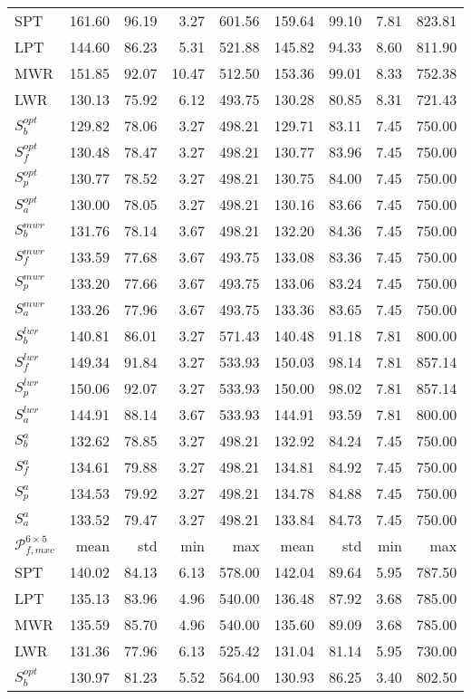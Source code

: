 {\begin{table}
{\begin{tabular}{|l|rrrr|rrrr|}
\hline
SPT &161.60&96.19&3.27&601.56&159.64&99.10&7.81&823.81\\
LPT &144.60&86.23&5.31&521.88&145.82&94.33&8.60&811.90\\
MWR &151.85&92.07&10.47&512.50&153.36&99.01&8.33&752.38\\
LWR &130.13&75.92&6.12&493.75&130.28&80.85&8.31&721.43\\
$S^{opt}_b$ &129.82&78.06&3.27&498.21&129.71&83.11&7.45&750.00\\
$S^{opt}_f$ &130.48&78.47&3.27&498.21&130.77&83.96&7.45&750.00\\
$S^{opt}_p$ &130.77&78.52&3.27&498.21&130.75&84.00&7.45&750.00\\
$S^{opt}_a$ &130.00&78.05&3.27&498.21&130.16&83.66&7.45&750.00\\
$S^{mwr}_b$ &131.76&78.14&3.67&498.21&132.20&84.36&7.45&750.00\\
$S^{mwr}_f$ &133.59&77.68&3.67&493.75&133.08&83.36&7.45&750.00\\
$S^{mwr}_p$ &133.20&77.66&3.67&493.75&133.06&83.24&7.45&750.00\\
$S^{mwr}_a$ &133.26&77.96&3.67&493.75&133.36&83.65&7.45&750.00\\
$S^{lwr}_b$ &140.81&86.01&3.27&571.43&140.48&91.18&7.81&800.00\\
$S^{lwr}_f$ &149.34&91.84&3.27&533.93&150.03&98.14&7.81&857.14\\
$S^{lwr}_p$ &150.06&92.07&3.27&533.93&150.00&98.02&7.81&857.14\\
$S^{lwr}_a$ &144.91&88.14&3.67&533.93&144.91&93.59&7.81&800.00\\
$S^{a}_b$ &132.62&78.85&3.27&498.21&132.92&84.24&7.45&750.00\\
$S^{a}_f$ &134.61&79.88&3.27&498.21&134.81&84.92&7.45&750.00\\
$S^{a}_p$ &134.53&79.92&3.27&498.21&134.78&84.88&7.45&750.00\\
$S^{a}_a$ &133.52&79.47&3.27&498.21&133.84&84.73&7.45&750.00\\
\hline
$\mathcal{P}^{6\times5}_{f,mxc}$& mean & std & min & max & mean & std & min & max \\
\hline
SPT &140.02&84.13&6.13&578.00&142.04&89.64&5.95&787.50\\
LPT &135.13&83.96&4.96&540.00&136.48&87.92&3.68&785.00\\
MWR &135.59&85.70&4.96&540.00&135.60&89.09&3.68&785.00\\
LWR &131.36&77.96&6.13&525.42&131.04&81.14&5.95&730.00\\
$S^{opt}_b$ &130.97&81.23&5.52&564.00&130.93&86.25&3.40&802.50\\

\end{tabular}}
\end{table}}
